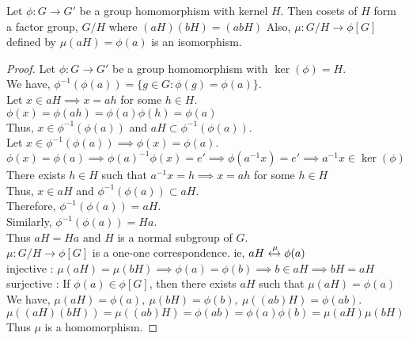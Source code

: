 \begin{theorem}
	Let $\phi : G \to G'$ be a group homomorphism with kernel $H$. Then cosets of $H$ form a factor group, $G/H$ where $(aH)(bH) = (abH)$ Also, $\mu : G/H \to \phi[G]$ defined by $\mu(aH) = \phi(a)$ is an isomorphism.
\end{theorem}
\begin{proof}
	Let $\phi : G \to G'$ be a group homomorphism with $\ker(\phi) = H$.\\
	We have, $\phi^{-1}(\phi(a)) = \{ g \in G : \phi(g) = \phi(a) \}$.\\

	Let $x \in aH \implies x = ah$ for some $h \in H$.\\
	$\phi(x) = \phi(ah) = \phi(a)\phi(h) = \phi(a)$\\
	Thus, $x \in \phi^{-1}(\phi(a))$ and $aH \subset \phi^{-1}(\phi(a))$.\\

	Let $x \in \phi^{-1}(\phi(a)) \implies \phi(x) = \phi(a)$.\\
	$\phi(x) = \phi(a) \implies \phi(a)^{-1} \phi(x) = e' \implies \phi(a^{-1}x) = e' \implies a^{-1}x \in \ker(\phi)$\\
	There exists $h \in H$ such that $a^{-1}x = h \implies x = ah$ for some $h \in H$\\
	Thus, $x \in aH$ and $\phi^{-1}(\phi(a)) \subset aH$.\\
	Therefore, $\phi^{-1}(\phi(a)) = aH$.\\
	
	Similarly, $\phi^{-1}(\phi(a)) = Ha$.\\
	Thus $aH = Ha$ and $H$ is a normal subgroup of $G$.\\

	$\mu : G/H \to \phi[G]$ is a one-one correspondence. ie, $aH \xleftrightarrow{\mu} \phi(a)$\\
	injective : $\mu(aH) = \mu(bH) \implies \phi(a) = \phi(b) \implies b \in aH \implies bH = aH$\\
	surjective : If $\phi(a) \in \phi[G]$, then there exists $aH$ such that  $\mu(aH) = \phi(a)$\\

	We have, $\mu(aH) = \phi(a),\ \mu(bH) = \phi(b),\ \mu((ab)H)  = \phi(ab)$.\\
	$\mu((aH)(bH)) = \mu((ab)H) = \phi(ab) = \phi(a)\phi(b) = \mu(aH)\mu(bH)$\\
	Thus $\mu$ is a homomorphism.
\end{proof}


